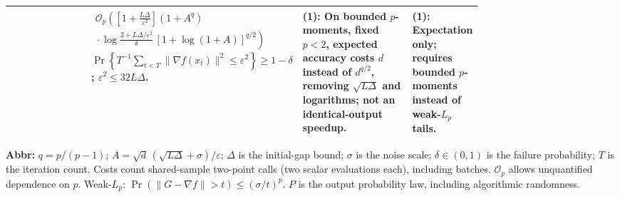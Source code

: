 \begin{table}[tp]
\begin{threeparttable}
\begin{tabularx}{\linewidth}{@{}>{\raggedright\arraybackslash}p{0.20\linewidth}>{\raggedright\arraybackslash}p{0.32\linewidth}>{\raggedright\arraybackslash}p{0.25\linewidth}>{\raggedright\arraybackslash}X@{}}
& $\begin{gathered}\mathcal{O}_p\!\left(\left[1+\frac{L\Delta}{\varepsilon^2}\right](1+A^q)\right.\\[-2pt]\left.{}\cdot\log\frac{2+L\Delta/\varepsilon^2}{\delta}\,[1+\log(1+A)]^{q/2}\right)\end{gathered}$
\newline $\Pr\!\left\{T^{-1}\sum_{t<T}\|\nabla f(x_t)\|^2\leq\varepsilon^2\right\}\geq1-\delta$; $\varepsilon^2\leq32L\Delta$.
& \textbf{(1)}: On bounded $p$-moments, fixed $p<2$, expected accuracy costs $d$ instead of $d^{q/2}$, removing $\sqrt{L\Delta}$ and logarithms; not an identical-output speedup.
& \textbf{(1)}: Expectation only; requires bounded $p$-moments instead of weak-$L_p$ tails. \\
\bottomrule
\end{tabularx}
\begin{tablenotes}[flushleft]\footnotesize
\item[] \textbf{Abbr:} $q=p/(p-1)$; $A=\sqrt d\,(\sqrt{L\Delta}+\sigma)/\varepsilon$; $\Delta$ is the initial-gap bound; $\sigma$ is the noise scale; $\delta\in(0,1)$ is the failure probability; $T$ is the iteration count. Costs count shared-sample two-point calls (two scalar evaluations each), including batches. $\mathcal{O}_p$ allows unquantified dependence on $p$. Weak-$L_p$: $\Pr(\|G-\nabla f\|>t)\leq(\sigma/t)^p$. $P$ is the output probability law, including algorithmic randomness.
\end{tablenotes}
\end{threeparttable}
\end{table}
